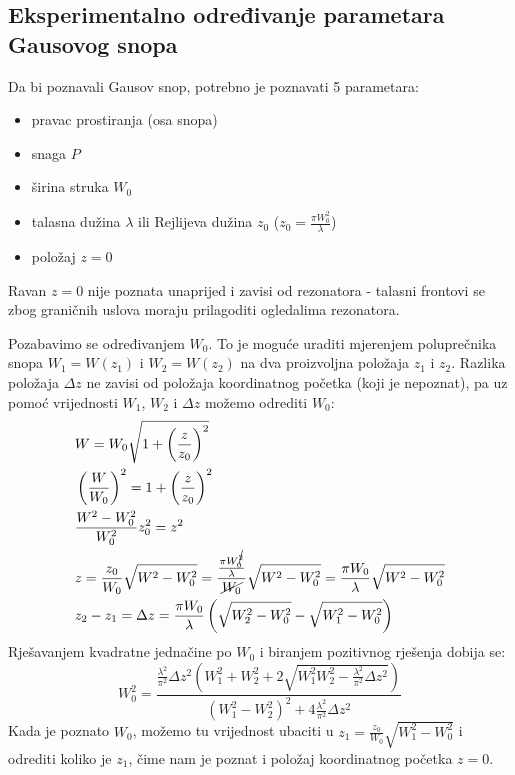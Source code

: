 \documentclass[fleqn]{report}
\begin{document}
\subsection{Eksperimentalno određivanje parametara Gausovog snopa}

Da bi poznavali Gausov snop, potrebno je poznavati 5 parametara:
\begin{itemize}
    \item pravac prostiranja (osa snopa)
    \item snaga $P$
    \item širina struka $W_0$
    \item talasna dužina $\lambda$ ili Rejlijeva dužina $z_0$ ($z_0 = \frac{\pi W_0^2}{\lambda}$)
    \item položaj $z = 0$
\end{itemize}
Ravan $z = 0$ nije poznata unaprijed i zavisi od rezonatora - talasni frontovi se zbog graničnih uslova moraju prilagoditi ogledalima rezonatora.

Pozabavimo se određivanjem $W_0$.
To je moguće uraditi mjerenjem poluprečnika snopa $W_1 = W(z_1)$ i $W_2 = W(z_2)$ na dva proizvoljna položaja $z_1$ i $z_2$.
Razlika položaja $\Delta z$ ne zavisi od položaja koordinatnog početka (koji je nepoznat), pa uz pomoć vrijednosti $W_1$, $W_2$ i $\Delta z$ možemo odrediti $W_0$:
\begin{align*}
     & W = W_0\sqrt{1 + \left(\frac{z}{z_0}\right)^2}                                                                                                                   \\
     & \left(\frac{W}{W_0}\right)^2 = 1 + \left(\frac{z}{z_0}\right)^2                                                                                                  \\
     & \frac{W^2 - W_0^2}{W_0^2} z_0^2 = z^2                                                                                                                            \\
     & z = \frac{z_0}{W_0} \sqrt{W^2 - W_0^2} = \frac{\frac{\pi W_0^{\cancel2}}{\lambda}}{\cancel{W_0}} \sqrt{W^2 - W_0^2} = \frac{\pi W_0}{\lambda} \sqrt{W^2 - W_0^2} \\
     & z_2 - z_1 = \Delta z = \frac{\pi W_0}{\lambda} \left(\sqrt{W_2^2 - W_0^2} - \sqrt{W_1^2 - W_0^2}\right)                                                          \\
\end{align*}
Rješavanjem kvadratne jednačine po $W_0$ i biranjem pozitivnog rješenja dobija se:
\begin{equation*}
    W_0^2 = \frac{\frac{\lambda^2}{\pi^2}\Delta z^2\left(W_1^2 + W_2^2 + 2\sqrt{W_1^2W_2^2 - \frac{\lambda^2}{\pi^2}\Delta z^2}\right)}{\left(W_1^2 - W_2^2\right)^2 + 4\frac{\lambda^2}{\pi^2}\Delta z^2}
\end{equation*}
Kada je poznato $W_0$, možemo tu vrijednost ubaciti u $z_1 = \frac{z_0}{W_0}\sqrt{W_1^2 - W_0^2}$ i odrediti koliko je $z_1$, čime nam je poznat i položaj koordinatnog početka $z = 0$.
\end{document}
